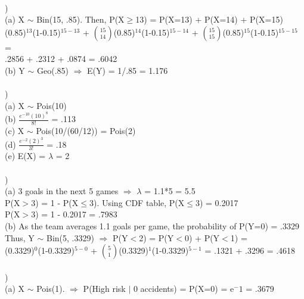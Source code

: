 \documentclass[12pt]{article}
\begin{document}
\noindent \hrulefill \\


)\\
\indent (a) X $\sim$ Bin(15, .85). Then, P(X$\ge$13) = P(X=13) + P(X=14) + P(X=15)\\[.4em]
\indent {}(0.85)$^{13}$(1-0.15)$^{15-13}$ + {\Large$\binom{15}{14}$}(0.85)$^{14}$(1-0.15)$^{15-14}$ + {\Large$\binom{15}{15}$}(0.85)$^{15}$(1-0.15)$^{15-15}$ = \\[.5em]
\indent \indent .2856 + .2312 + .0874 = .6042\\

\indent (b) Y $\sim$ Geo(.85) $\Rightarrow$ E(Y) = 1/.85 = 1.176\\


\noindent \hrulefill \\


)\\
\indent (a) X $\sim$ Pois(10)\\

\indent (b) {\Large $\frac{e^{-10}(10)^8}{8!}$} = .113\\

\indent (c) X $\sim$ Pois(10/(60/12)) = Pois(2)\\

\indent (d) {\Large $\frac{e^{-2}(2)^3}{3!}$} = .18\\

\indent (e) E(X) = $\lambda$ = 2\\


\noindent \hrulefill \\


)\\
\indent (a) 3 goals in the next 5 games $\Rightarrow$ $\lambda$ = 1.1*5 = 5.5\\
\indent \indent P(X$>$3) = 1 - P(X$\le$3). \indent\indent\indent Using CDF table, P(X$\le$3) = 0.2017\\ 
\indent \indent P(X$>$3) = 1 - 0.2017 = .7983\\

\indent (b) As the team averages 1.1 goals per game, the probability of P(Y=0) = .3329\\
\indent \indent Thus, Y $\sim$ Bin(5, .3329) $\Rightarrow$ P(Y$<$2) = P(Y$<$0) + P(Y$<$1) = \\[.4em]
\indent {}(0.3329)$^{0}$(1-0.3329)$^{5-0}$ + {\Large$\binom{5}{1}$}(0.3329)$^{1}$(1-0.3329)$^{5-1}$ = .1321 + .3296 = .4618\\


\noindent \hrulefill \\


)\\
\indent \indent (a) X $\sim$ Pois(1).  $\Rightarrow$ P(High risk $|$ 0 accidents) = P(X=0) = e$^-1$ = .3679\\
\end{document}
